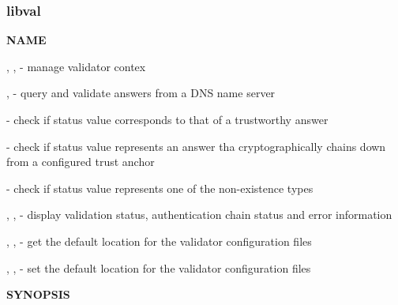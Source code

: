 \clearpage

\subsubsection{libval}

{\bf NAME}

, ,
 - manage validator contex

,  -
query and validate answers from a DNS name server

 - check if status value corresponds to that of a
trustworthy answer

 - check if status value represents an answer tha
cryptographically chains down from a configured trust anchor

 - check if status value represents
one of the non-existence types

, ,  -
display validation status, authentication chain status and error information

, ,
 - get the default location for the validator
configuration files

, ,
 - set the default location for the validator
configuration files

{\bf SYNOPSIS}

